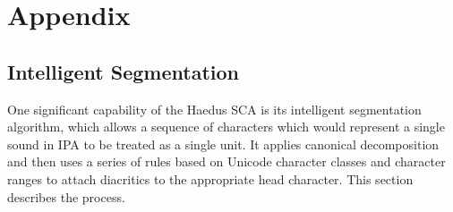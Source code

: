\documentclass[10pt,letterpaper]{article}
\begin{document}
\section{Appendix}
\label{sec:appendix}

\subsection{Intelligent Segmentation}
\label{sub:segmentation}
One significant capability of the Haedus SCA is its intelligent segmentation algorithm, which allows a sequence of characters which would represent a single sound in IPA to be treated as a single unit. It applies canonical decomposition and then uses a series of rules based on Unicode character classes and character ranges to attach diacritics to the appropriate head character. This section describes the process.


\end{document}
